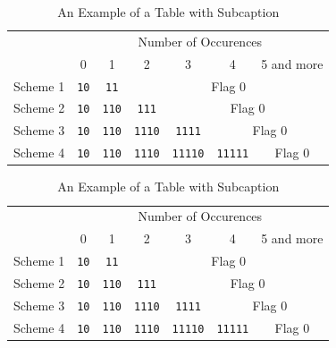 \documentclass[10pt,conference,a4paper,nofonttune]{IEEEtran}
\begin{document}
\begin{table}[!t]
   \centering
   \caption{An Example of a Table with Subcaption}
   \label{Tbl:ExampleWithSubcaption}
   \footnotesize
   {
      \renewcommand{\arraystretch}{1.2}
      \begin{tabular}{c|c|c|c|c|c|c}
\hline\hline
        & \multicolumn{6}{c}{Number of Occurences} \\\cline{2-7}
        & 0 & 1 & 2 & 3 & 4 & 5 and more \\\hline
Scheme 1&\texttt{10}&\texttt{11} &\multicolumn{4}{c}{\scriptsize Flag 0} \\\hline
Scheme 2&\texttt{10}&\texttt{110}&\texttt{111} &\multicolumn{3}{c}{\scriptsize Flag 0}\\\hline
Scheme 3&\texttt{10}&\texttt{110}&\texttt{1110}&\texttt{1111} &\multicolumn{2}{c}{\scriptsize Flag 0} \\\hline
Scheme 4&\texttt{10}&\texttt{110}&\texttt{1110}&\texttt{11110}&\texttt{11111}&{\scriptsize Flag 0}\\\hline
\hline
      \end{tabular}
   }
   {
      \renewcommand{\arraystretch}{1.2}
      \begin{tabular}{c|c|c|c|c|c|c}
\hline\hline
        & \multicolumn{6}{c}{Number of Occurences} \\\cline{2-7}
        & 0 & 1 & 2 & 3 & 4 & 5 and more \\\hline
Scheme 1&\texttt{10}&\texttt{11} &\multicolumn{4}{c}{\scriptsize Flag 0} \\\hline
Scheme 2&\texttt{10}&\texttt{110}&\texttt{111} &\multicolumn{3}{c}{\scriptsize Flag 0}\\\hline
Scheme 3&\texttt{10}&\texttt{110}&\texttt{1110}&\texttt{1111} &\multicolumn{2}{c}{\scriptsize Flag 0} \\\hline
Scheme 4&\texttt{10}&\texttt{110}&\texttt{1110}&\texttt{11110}&\texttt{11111}&{\scriptsize Flag 0}\\\hline
\hline
      \end{tabular}
   }
\end{table}
\end{document}
